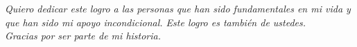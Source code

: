 \thispagestyle{empty}
\null\vfill
\begin{flushright}
  {\large{\textit{Quiero dedicar este logro a las personas que han sido fundamentales en mi vida y que han sido mi apoyo incondicional.
Este logro es también de ustedes. \\Gracias por ser parte de mi historia.}}}
\end{flushright}